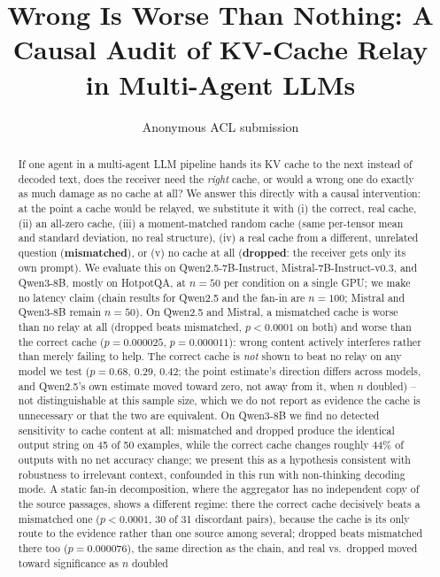 \documentclass[11pt]{article}
\title{Wrong Is Worse Than Nothing: A Causal Audit of KV-Cache Relay in Multi-Agent LLMs}
\author{Anonymous ACL submission}
\begin{document}
\maketitle

\begin{abstract}
If one agent in a multi-agent LLM pipeline hands its KV cache to the
next instead of decoded text, does the receiver need the \emph{right}
cache, or would a wrong one do exactly as much damage as no cache at
all? We answer this directly with a causal intervention: at the point a
cache would be relayed, we substitute it with (i) the correct, real
cache, (ii) an
all-zero cache, (iii) a moment-matched random cache (same per-tensor
mean and standard deviation, no real structure), (iv) a real cache from
a different, unrelated question (\textbf{mismatched}), or (v) no cache
at all (\textbf{dropped}: the receiver gets only its own prompt). We
evaluate this on Qwen2.5-7B-Instruct, Mistral-7B-Instruct-v0.3, and
Qwen3-8B, mostly on HotpotQA, at $n=50$ per condition on a single GPU;
we make no latency claim (chain results for Qwen2.5 and the fan-in are
$n=100$; Mistral and Qwen3-8B remain $n=50$). On Qwen2.5 and Mistral, a
mismatched cache is worse than no relay at all (dropped beats
mismatched, $p<0.0001$ on both) and worse than the correct cache
($p=0.000025$, $p=0.000011$): wrong content actively interferes rather
than merely failing to help. The correct cache is \emph{not} shown to
beat no relay on any model we test ($p=0.68$, $0.29$, $0.42$; the point
estimate's direction differs across models, and Qwen2.5's own estimate
moved toward zero, not away from it, when $n$ doubled) -- not
distinguishable at this sample size, which we do not report as evidence
the cache is unnecessary or that the two are equivalent. On Qwen3-8B we
find no detected sensitivity to cache content at all: mismatched and
dropped produce the identical output string on 45 of 50 examples, while
the correct cache changes roughly 44\% of outputs with no net accuracy
change; we present this as a hypothesis consistent with robustness to
irrelevant context, confounded in this run with non-thinking decoding
mode. A static fan-in decomposition, where the aggregator has no
independent copy of the source passages, shows a different regime:
there the correct cache decisively beats a mismatched one
($p<0.0001$, 30 of 31 discordant pairs), because the cache is its only
route to the evidence rather than one source among several; dropped
beats mismatched there too ($p=0.000076$), the same direction as the
chain, and real vs.\ dropped moved toward significance as $n$ doubled

\end{abstract}
\end{document}
